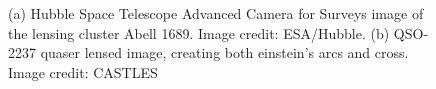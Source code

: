 \begin{figure}
   \centering
    \begin{minipage}[c]{0.38\textwidth}
    \centering
    \end{minipage}
    \begin{minipage}[c]{0.4\textheight}%
	\centering    
    \end{minipage} 
    \caption{ (a) Hubble Space Telescope Advanced Camera for Surveys image of the lensing cluster Abell 1689. Image credit: ESA/Hubble. (b) QSO-2237 quaser lensed image, creating both einstein's arcs and cross. Image credit: CASTLES \label{fig:StrongLens}}
\end{figure}

